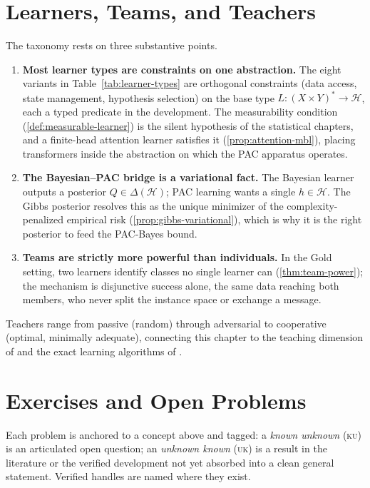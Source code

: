 \section{Learners, Teams, and Teachers}
\label{sec:ch4-summary}

The taxonomy rests on three substantive points.

\begin{enumerate}[leftmargin=*,itemsep=3pt]
\item \textbf{Most learner types are constraints on one abstraction.} The eight variants in Table~\ref{tab:learner-types} are orthogonal constraints (data access, state management, hypothesis selection) on the base type $L \colon (X \times Y)^\ast \to \mathcal{H}$, each a typed predicate in the development. The measurability condition (\cref{def:measurable-learner}) is the silent hypothesis of the statistical chapters, and a finite-head attention learner satisfies it (\cref{prop:attention-mbl}), placing transformers inside the abstraction on which the PAC apparatus operates.

\item \textbf{The Bayesian--PAC bridge is a variational fact.} The Bayesian learner outputs a posterior $Q \in \Delta(\mathcal{H})$; PAC learning wants a single $h \in \mathcal{H}$. The Gibbs posterior resolves this as the unique minimizer of the complexity-penalized empirical risk (\cref{prop:gibbs-variational}), which is why it is the right posterior to feed the PAC-Bayes bound.

\item \textbf{Teams are strictly more powerful than individuals.} In the Gold setting, two learners identify classes no single learner can (\cref{thm:team-power}); the mechanism is disjunctive success alone, the same data reaching both members, who never split the instance space or exchange a message.
\end{enumerate}

Teachers range from passive (random) through adversarial to cooperative (optimal, minimally adequate), connecting this chapter to the teaching dimension of  and the exact learning algorithms of .

\section{Exercises and Open Problems}
\label{sec:ch4-open}

Each problem is anchored to a concept above and tagged: a \emph{known unknown} (\textsc{ku}) is an articulated open question; an \emph{unknown known} (\textsc{uk}) is a result in the literature or the verified development not yet absorbed into a clean general statement. Verified handles are named where they exist.

